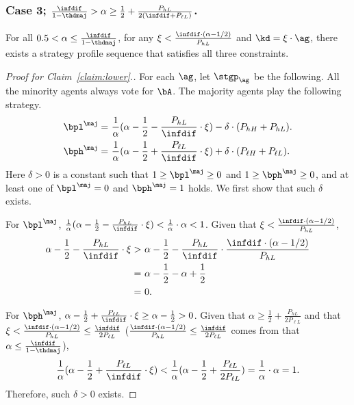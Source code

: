 \subsubsection{Case 3; $\frac{\infdif}{1 - \thdmaj} > \alpha \ge \frac12 + \frac{P_{hL}}{2(\infdif + P_{\ell L})}$.}

\begin{claim}
\label{claim:lower2}
    For all $0.5 < \alpha \le \frac{\infdif}{1 - \thdmaj}$, for any $\xi < \frac{\infdif \cdot (\alpha - 1/2)}{P_{hL}}$ and $\kd = \xi\cdot \ag$, there exists a strategy profile sequence that satisfies all three constraints. 
\end{claim}

\begin{proof}[Proof for Claim~\ref{claim:lower}.]
    For each $\ag$, let $\stgp_\ag$ be the following. All the minority agents always vote for $\bA$. The majority agents play the following strategy.
    \begin{align*}
        \bpl^{\maj}  =&\ \frac1{\alpha} (\alpha - \frac12 - \frac{P_{hL}}{\infdif}\cdot \xi) - \delta \cdot (P_{h H} + P_{h L}).\\
        \bph^{\maj}  =&\ \frac1{\alpha} (\alpha - \frac12 + \frac{P_{\ell L}}{\infdif}\cdot \xi) +  \delta \cdot (P_{\ell H} + P_{\ell L}).
    \end{align*}
    Here $\delta > 0$ is a constant such that $1 \ge \bpl^{\maj} \ge 0$ and $1 \ge \bph^{\maj} \ge 0$, and at least one of $\bpl^{\maj} = 0$ and $\bph^{\maj} = 1$ holds. We first show that such $\delta$ exists. 

    For $\bpl^{\maj}$, $\frac1{\alpha} (\alpha - \frac12 - \frac{P_{hL}}{\infdif}\cdot \xi) <\frac1{\alpha} \cdot \alpha < 1$. 
    Given that $\xi < \frac{\infdif \cdot (\alpha - 1/2)}{P_{hL}}$, 
    \begin{align*}
        \alpha - \frac12 - \frac{P_{hL}}{\infdif}\cdot \xi >&\ \alpha - \frac12 - \frac{P_{hL}}{\infdif}\cdot  \frac{\infdif \cdot (\alpha - 1/2)}{P_{hL}}\\
        =&\ \alpha - \frac12-  \alpha + \frac12\\
        =&\ 0. 
    \end{align*}

    For $\bph^{\maj}$, $\alpha - \frac12 + \frac{P_{\ell L}}{\infdif}\cdot \xi \ge \alpha - \frac12 > 0$. Given that $\alpha \ge \frac{1}{2} + \frac{P_{hL}}{2P_{\ell L}}$ and that $\xi < \frac{\infdif \cdot (\alpha - 1/2)}{P_{hL}} \le \frac{\infdif}{2P_{\ell L}}$ ($\frac{\infdif \cdot (\alpha - 1/2)}{P_{hL}} \le \frac{\infdif}{2P_{\ell L}}$ comes from that $\alpha \le \frac{\infdif}{1 -\thdmaj}$), 
    \begin{align*}
        \frac1{\alpha} (\alpha - \frac12 + \frac{P_{\ell L}}{\infdif}\cdot \xi) < \frac{1}{\alpha}(\alpha - \frac12 +  \frac{P_{\ell L}}{2P_{\ell L}}) = \frac{1}{\alpha}\cdot \alpha = 1.
    \end{align*}
    Therefore, such $\delta  > 0$ exists. 


\end{proof}

